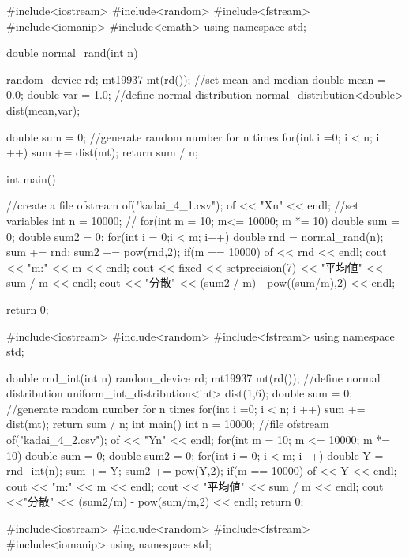 \documentclass[fleqn, a4paper. 12pt]{ltjsarticle} %
\begin{document}
\begin{cppcode}
#include<iostream>
#include<random>
#include<fstream>
#include<iomanip>
#include<cmath>
using namespace std;

double normal_rand(int n){
    random_device rd;
    mt19937 mt(rd());
    //set mean and median
    double mean = 0.0;
    double var = 1.0;
    //define normal distribution
    normal_distribution<double> dist(mean,var);

    double sum = 0;
    //generate random number for n times
    for(int i =0; i < n; i ++){
        sum += dist(mt);
    }
    return sum / n;
}
int main(){
    //create a file
    ofstream of("kadai_4_1.csv");
    of << "Xn" << endl;
    //set variables
    int n = 10000;
    //
    for(int m = 10; m<= 10000; m *= 10){
       double sum = 0;
       double sum2 = 0;
       for(int i = 0;i < m; i++){
        double rnd = normal_rand(n);
        sum += rnd;
        sum2 += pow(rnd,2);
        if(m == 10000){
            of << rnd << endl;
        }
       }
       cout << "m:" << m << endl;
       cout << fixed << setprecision(7) << "平均値" << sum / m << endl;
       cout << "分散" << (sum2 / m) - pow((sum/m),2) << endl;
    }


    return 0;
}
#include<iostream>
#include<random>
#include<fstream>
using namespace std;

double rnd_int(int n){
    random_device rd;
    mt19937 mt(rd());
    //define normal distribution
    uniform_int_distribution<int> dist(1,6);
    double sum = 0;
    //generate random number for n times
    for(int i =0; i < n; i ++){
        sum += dist(mt);
    }
    return sum / n;
}
int main(){
    int n = 10000;
    //file
    ofstream of("kadai_4_2.csv");
    of << "Yn" << endl;
    for(int m = 10; m <= 10000; m *= 10){
        double sum = 0;
        double sum2 = 0;
        for(int i = 0; i < m; i++){
            double Y = rnd_int(n);
            sum += Y;
            sum2 += pow(Y,2);
            if(m == 10000){
                of << Y << endl;
            }
        }
        cout << "m:" << m << endl;
        cout << "平均値" << sum / m << endl;
        cout <<"分散" << (sum2/m) - pow(sum/m,2) << endl;
    }
    return 0;
}

#include<iostream>
#include<random>
#include<fstream>
#include<iomanip>
using namespace std;


\end{cppcode}
\end{document}
